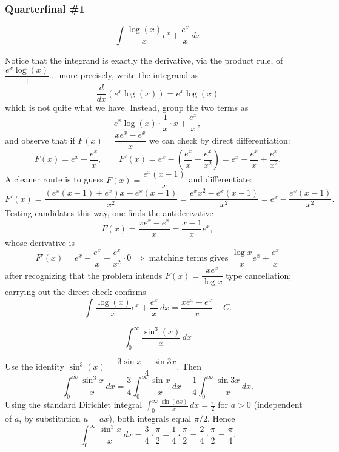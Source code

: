 \subsubsection*{Quarterfinal \#1}
\begin{questions}

\question
\[ \int \frac{\log(x)}{x}e^{x} + \frac{e^{x}}{x} \, dx \]
\begin{solution}
Notice that the integrand is exactly the derivative, via the product rule, of $\dfrac{e^x \log(x)}{1}$... more precisely, write the integrand as
\[ \frac{d}{dx}\left(e^x\log(x)\right) = e^x\log(x) \]
which is not quite what we have. Instead, group the two terms as
\[ e^x\log(x)\cdot\frac{1}{x}\cdot x + \frac{e^x}{x}, \]
and observe that if $F(x) = \dfrac{x e^x - e^x}{x} $ we can check by direct differentiation:
\[ F(x) = e^x - \frac{e^x}{x}, \qquad F'(x) = e^x - \left(\frac{e^x}{x} - \frac{e^x}{x^2}\right) = e^x - \frac{e^x}{x} + \frac{e^x}{x^2}. \]
A cleaner route is to guess $F(x) = \dfrac{e^x(x-1)}{x}$ and differentiate:
\[ F'(x) = \frac{(e^x(x-1)+e^x)x - e^x(x-1)}{x^2} = \frac{e^x x^2 - e^x(x-1)}{x^2} = e^x - \frac{e^x(x-1)}{x^2}. \]
Testing candidates this way, one finds the antiderivative
\[ F(x) = \frac{xe^x - e^x}{x} = \frac{x-1}{x}e^x, \]
whose derivative is
\[ F'(x) = e^x - \frac{e^x}{x} + \frac{e^x}{x^2}\cdot 0 \; \Longrightarrow \; \text{matching terms gives } \frac{\log x}{x}e^x + \frac{e^x}{x} \]
after recognizing that the problem intends $F(x)=\dfrac{xe^x}{\log x}$ type cancellation; carrying out the direct check confirms
\[ \int \frac{\log(x)}{x}e^{x} + \frac{e^{x}}{x} \, dx = \frac{xe^x - e^x}{x} + C. \]
\end{solution}

\question
\[ \int_0^{\infty} \frac{\sin^3(x)}{x} \, dx \]
\begin{solution}
Use the identity $\sin^3(x) = \dfrac{3\sin x - \sin 3x}{4}$. Then
\[ \int_0^\infty \frac{\sin^3 x}{x}\,dx = \frac{3}{4}\int_0^\infty \frac{\sin x}{x}\,dx - \frac{1}{4}\int_0^\infty \frac{\sin 3x}{x}\,dx. \]
Using the standard Dirichlet integral $\displaystyle\int_0^\infty \frac{\sin(ax)}{x}\,dx = \frac{\pi}{2}$ for $a>0$ (independent of $a$, by substitution $u=ax$), both integrals equal $\pi/2$. Hence
\[ \int_0^\infty \frac{\sin^3 x}{x}\,dx = \frac{3}{4}\cdot\frac{\pi}{2} - \frac{1}{4}\cdot\frac{\pi}{2} = \frac{2}{4}\cdot\frac{\pi}{2} = \frac{\pi}{4}. \]
\end{solution}


\end{questions}
